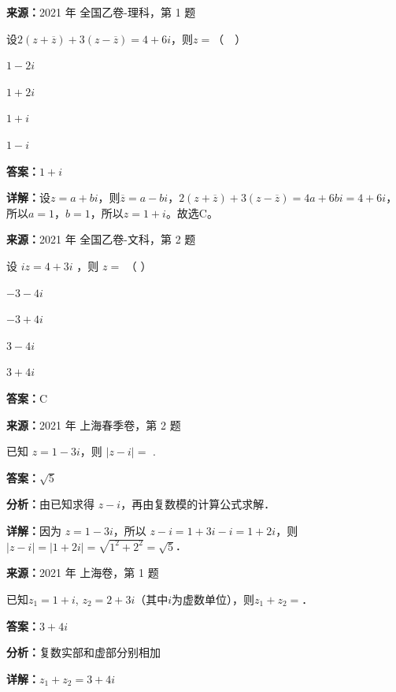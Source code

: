 \begin{question}[points=5]
\textbf{来源：}2021 年 全国乙卷-理科，第 1 题\par
设$2(z+\overline{z})+3(z-\overline{z})=4+6i$，则$z=$（  ）
\begin{choices}
  \item $1-2i$
  \item $1+2i$
  \item $1+i$
  \item $1-i$
\end{choices}
\begin{solution}
\textbf{答案：}$1+i$

\textbf{详解：}设$z=a+bi$，则$\overline{z}=a-bi$，$2(z+\overline{z})+3(z-\overline{z})=4a+6bi=4+6i$，所以$a=1$，$b=1$，所以$z=1+i$。故选C。
\end{solution}
\end{question}

\begin{question}[points=5]
\textbf{来源：}2021 年 全国乙卷-文科，第 2 题\par
设 $iz = 4 + 3i$ ，则 $z =$ （ ）
\begin{choices}
  \item $-3-4i$
  \item $-3+4i$
  \item $3-4i$
  \item $3+4i$
\end{choices}
\begin{solution}
\textbf{答案：}C
\end{solution}
\end{question}

\begin{question}[points=4]
\textbf{来源：}2021 年 上海春季卷，第 2 题\par
已知 $z=1-3i$，则 $|z-i|=$  .
\fillin[{$\sqrt{5}$}]
\begin{solution}
\textbf{答案：}$\sqrt{5}$

\textbf{分析：}由已知求得 $z-i$，再由复数模的计算公式求解．

\textbf{详解：}因为 $z=1-3i$，所以 $z-i=1+3i-i=1+2i$，则 $|z-i|=|1+2i|=\sqrt{1^2+2^2}=\sqrt{5}$．
\end{solution}
\end{question}

\begin{question}[points=4]
\textbf{来源：}2021 年 上海卷，第 1 题\par
已知$z_1=1+i$, $z_2=2+3i$（其中$i$为虚数单位），则$z_1+z_2=$．
\fillin[{$3+4i$}]
\begin{solution}
\textbf{答案：}$3+4i$

\textbf{分析：}复数实部和虚部分别相加

\textbf{详解：}$z_1+z_2=3+4i$
\end{solution}
\end{question}

